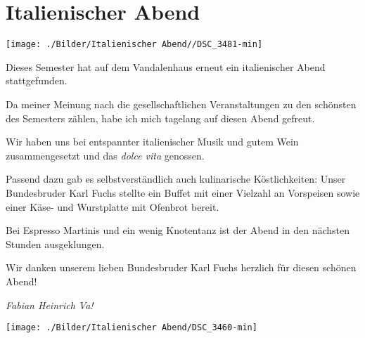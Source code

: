 \section{Italienischer Abend}

\begin{figurehere}
		\begin{center}
			\texttt{[image: ./Bilder/Italienischer Abend//DSC\_3481-min]}
		\end{center}
	\end{figurehere}

\begin{multicols}{2}

Dieses Semester hat auf dem Vandalenhaus erneut ein italienischer Abend
stattgefunden.

Da meiner Meinung nach
die gesellschaftlichen Veranstaltungen zu den schönsten des Semesters zählen,
habe ich mich tagelang auf diesen Abend gefreut.

Wir haben uns bei entspannter italienischer Musik und gutem Wein
zusammengesetzt und das \textit{dolce vita} genossen.

Passend dazu gab es
selbstverständlich auch kulinarische Köstlichkeiten: Unser Bundesbruder Karl
Fuchs stellte ein Buffet mit einer Vielzahl an Vorspeisen sowie einer Käse- und
Wurstplatte mit Ofenbrot bereit.

Bei Espresso Martinis und ein wenig Knotentanz ist der Abend in den
nächsten Stunden ausgeklungen.

Wir danken unserem lieben Bundesbruder Karl Fuchs herzlich für diesen
schönen Abend!

	\begin{flushright}
		\hfill\emph{Fabian Heinrich Va!}
	\end{flushright}
\end{multicols}

\begin{center}
\begin{figurehere}\texttt{[image: ./Bilder/Italienischer Abend/DSC\_3460-min]}
\end{figurehere}
\end{center}
	
